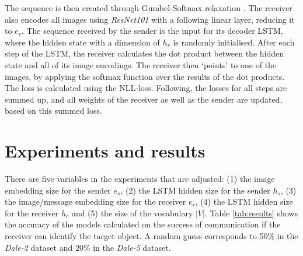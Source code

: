 \documentclass[11pt]{article}
\begin{document}
The sequence is then created through Gumbel-Softmax relaxation \citep{Jang2016}.
%
The receiver also encodes all images using \emph{ResNet101} with a following linear layer, reducing it to $e_r$.
The sequence received by the sender is the input for its decoder LSTM, where the hidden state with a dimension of $h_r$ is randomly initialised.
After each step of the LSTM, the receiver calculates the dot product between the hidden state and all of its image encodings.
The receiver then `points' to one of the images, by applying the softmax function over the results of the dot products.
The loss is calculated using the NLL-loss.
Following, the losses for all steps are summed up, and all weights of the receiver as well as the sender are updated, based on this summed loss.



\section{Experiments and results}

There are five variables in the experiments that are adjusted:
(1) the image embedding size for the sender $e_s$, (2) the LSTM hidden size for the sender $h_s$, (3) the image/message embedding size for the receiver $e_r$, (4) the LSTM hidden size for the receiver $h_r$ and (5) the size of the vocabulary $|V|$.
%
Table \ref{tab:results} shows the accuracy of the models calculated on the success of communication if the receiver can identify the target object. 
A random guess corresponds to 50\% in the \emph{Dale-2} dataset and 20\% in the \emph{Dale-5} dataset.


\end{document}
